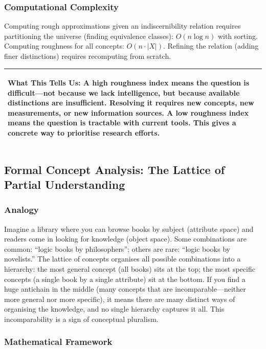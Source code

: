 \documentclass[11pt,letterpaper]{article}
\theoremstyle{definition}
\theoremstyle{remark}
\newenvironment{insightbox}{%
  \vspace{0.3cm}%
  \noindent\begin{tabular}{|p{\dimexpr\textwidth-4\tabcolsep-2\arrayrulewidth}|}
  \hline
  \small\itshape\color{accent}
}{%
  \\ \hline
  \end{tabular}
  \vspace{0.3cm}
}
\begin{document}
\subsubsection*{Computational Complexity}

Computing rough approximations given an indiscernibility relation requires partitioning the universe (finding equivalence classes): $O(n \log n)$ with sorting. Computing roughness for all concepts: $O(n \cdot |X|)$. Refining the relation (adding finer distinctions) requires recomputing from scratch.

\begin{insightbox}
\textbf{What This Tells Us:} A high roughness index means the question is difficult---not because we lack intelligence, but because available distinctions are insufficient. Resolving it requires new concepts, new measurements, or new information sources. A low roughness index means the question is tractable with current tools. This gives a concrete way to prioritise research efforts.
\end{insightbox}

\subsection{Formal Concept Analysis: The Lattice of Partial Understanding}
\label{sec:fca}

\subsubsection*{Analogy}

Imagine a library where you can browse books by subject (attribute space) and readers come in looking for knowledge (object space). Some combinations are common: ``logic books by philosophers''; others are rare: ``logic books by novelists.'' The lattice of concepts organises all possible combinations into a hierarchy: the most general concept (all books) sits at the top; the most specific concepts (a single book by a single attribute) sit at the bottom. If you find a huge antichain in the middle (many concepts that are incomparable---neither more general nor more specific), it means there are many distinct ways of organising the knowledge, and no single hierarchy captures it all. This incomparability is a sign of conceptual pluralism.

\subsubsection*{Mathematical Framework}
\end{document}
